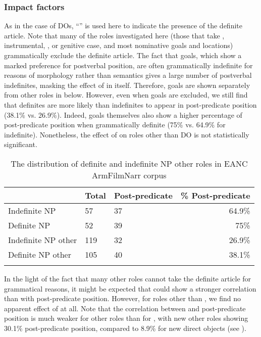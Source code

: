 \documentclass[output=paper,colorlinks,citecolor=brown,draftmode]{langscibook}
\begin{document}
\subsubsection{Impact factors}\label{Armenian:ss:3.3.2}

 As in the case of DOs, ``'' is used here to indicate the presence of the definite article. Note that many of the roles investigated here (those that take , instrumental, , or genitive case, and most nominative goals and locations) grammatically exclude the definite article. The fact that goals, which show a marked preference for postverbal position, are often grammatically indefinite for reasons of morphology rather than semantics gives a large number of postverbal indefinites, masking the effect of  in itself. Therefore, goals are shown separately from other roles in  below.  However, even when goals are excluded, we still find that definites are more likely than indefinites to appear in post-predicate position (38.1\% vs. 26.9\%). Indeed, goals themselves also show a higher percentage of post-predicate position when grammatically definite (75\% vs. 64.9\% for indefinite). Nonetheless, the effect of  on roles other than DO is not statistically significant.

\begin{table}
    \begin{tabularx}{\textwidth}{lYYr}
\lsptoprule
& Total & Post-predicate & \% Post-predicate \\
\midrule
Indefinite NP &57&37&64.9\% \\
Definite NP &52&39&75\% \\
Indefinite NP other&119&32&26.9\% \\
Definite NP other&105&40&38.1\% \\
\lspbottomrule
    \end{tabularx}
    \caption{The distribution of definite and indefinite NP other roles in EANC ArmFilmNarr corpus}
    \label{Armenian:tab:16}
\end{table}

 In the light of the fact that many other roles cannot take the definite article for grammatical reasons, it might be expected that  could show a stronger correlation than  with post-predicate position. However, for roles other than , we find no apparent effect of  at all. Note that the correlation between  and post-predicate position is much weaker for other roles than for , with new other roles showing 30.1\% post-predicate position, compared to 8.9\% for new direct objects (see ).
\end{document}
